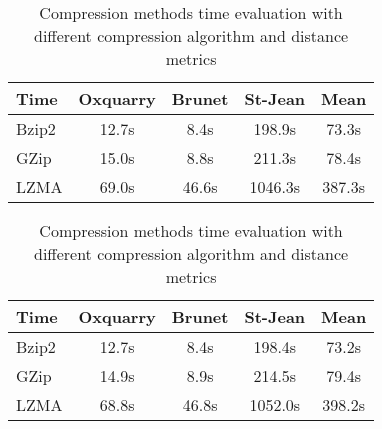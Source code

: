 \begin{table}[!t]
  \centering
  \caption{Compression methods time evaluation with different compression algorithm and distance metrics}
  \label{tab:compression_evaluation_times}

  \begin{tabular}{l c c c|c}
    \toprule
    Time      & Oxquarry  & Brunet & St-Jean & Mean\\
    \midrule
    Bzip2     & 12.7s     & 8.4s   & 198.9s  & 73.3s\\
    GZip      & 15.0s     & 8.8s   & 211.3s  & 78.4s\\
    LZMA      & 69.0s     & 46.6s  & 1046.3s & 387.3s\\
    \bottomrule
  \end{tabular}

  \vspace{0.5cm}

  \begin{tabular}{l c c c|c}
    \toprule
    Time      & Oxquarry & Brunet & St-Jean & Mean\\
    \midrule
    Bzip2     & 12.7s    & 8.4s   & 198.4s  & 73.2s\\
    GZip      & 14.9s    & 8.9s   & 214.5s  & 79.4s\\
    LZMA      & 68.8s    & 46.8s  & 1052.0s & 398.2s\\
    \bottomrule
  \end{tabular}
\end{table}
